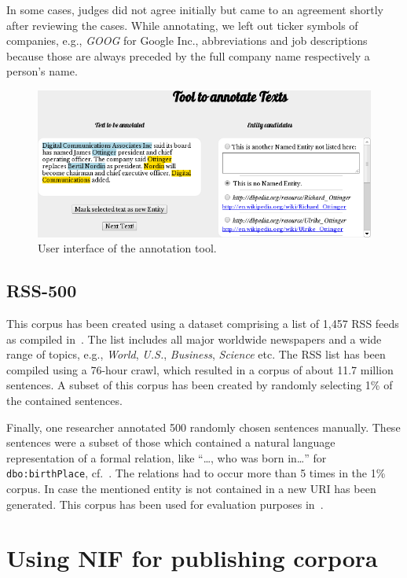In some cases, judges did not agree initially but came to an agreement shortly after reviewing the cases.
While annotating, we left out ticker symbols of companies, e.g., \textit{GOOG} for Google Inc., abbreviations and job descriptions because those are always preceded by the full company name respectively a person's name.

\begin{figure}[htb!]
\centering
\includegraphics[width=\linewidth]{part_02/benchmarking/LREC_N3NIFNERNED/qrtool.png}
\caption{User interface of the annotation tool.}
\label{n3:fig:qrtool}
\end{figure}


\subsection{RSS-500}

This corpus has been created using a dataset comprising a list of 1,457 RSS feeds as compiled in~\cite{GOLDHAHN12.327}.
The list includes all major worldwide newspapers and a wide range of topics, e.g., \emph{World}, \emph{U.S.}, \emph{Business}, \emph{Science} etc.
The RSS list has been compiled using a 76-hour crawl, which resulted in a corpus of about 11.7 million sentences.
A subset of this corpus has been created by randomly selecting 1\% of the contained sentences.
 
Finally, one researcher annotated 500 randomly chosen sentences manually.
These sentences were a subset of those which contained a natural language representation of a formal relation, like ``\ldots, who was born in\ldots '' for \texttt{dbo:birthPlace}, cf.~\cite{conf/ekaw/GerberN12}.
The relations had to occur more than 5 times in the 1\% corpus. %
In case the mentioned entity is not contained in a new URI has been generated.
This corpus has been used for evaluation purposes in~\cite{GER+13}.

\section{Using NIF for publishing corpora}
\label{n3:NIF}



